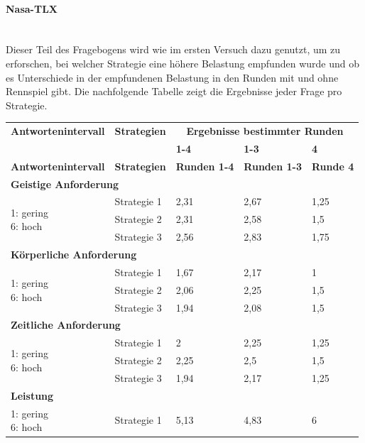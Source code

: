 \documentclass[12pt,a4paper]{scrartcl}
\begin{document}
\paragraph{Nasa-TLX}
~\\
Dieser Teil des Fragebogens wird wie im ersten Versuch dazu genutzt, um zu erforschen, bei welcher Strategie eine höhere Belastung empfunden wurde und ob es Unterschiede in der empfundenen Belastung in den Runden mit und ohne Rennspiel gibt. 
Die nachfolgende Tabelle zeigt die Ergebnisse jeder Frage pro Strategie.
\newpage
\begin{longtable}{|p{4cm}|p{2cm}|p{2cm}|p{2cm}|p{2cm}|}
	\hline
		\textbf{Antwortenintervall}&\textbf{Strategien}&\multicolumn{3}{c|}{\textbf{Ergebnisse bestimmter Runden}}\\
	&&\textbf{1-4}&\textbf{1-3} &\textbf{4}\\
	\hline
	\endfirsthead
	\hline
	\textbf{Antwortenintervall}&\textbf{Strategien}&\textbf{Runden 1-4}&\textbf{Runden 1-3} &\textbf{Runde 4}\\
	\hline
	\endhead
		\multicolumn{5}{l}{\textbf{Geistige Anforderung}}\\
		\hline
\multirow{3}{4cm}{1: gering \newline 6: hoch} & Strategie 1 &  2,31 & 2,67 & 1,25 \\
 & Strategie 2 & 2,31 & 2,58 & 1,5\\
 & Strategie 3 & 2,56 & 2,83 & 1,75 \\
\hline
		\multicolumn{5}{l}{\textbf{Körperliche Anforderung}}\\
		\hline
\multirow{3}{4cm}{1: gering \newline 6: hoch} & Strategie 1 & 1,67 & 2,17 & 1 \\
 & Strategie 2 & 2,06 & 2,25 & 1,5 \\
 & Strategie 3 & 1,94 & 2,08 & 1,5 \\
\hline
		\multicolumn{5}{l}{\textbf{Zeitliche Anforderung}}\\
		\hline
\multirow{3}{4cm}{1: gering \newline 6: hoch} & Strategie 1 & 2 & 2,25 & 1,25 \\
 & Strategie 2 & 2,25 & 2,5 & 1,5 \\
 & Strategie 3 & 1,94 & 2,17 & 1,25 \\
\hline
		\multicolumn{5}{l}{\textbf{Leistung}}\\
		\hline
\multirow{3}{4cm}{1: gering \newline 6: hoch} & Strategie 1 & 5,13 & 4,83 & 6 \\

\end{longtable}
\end{document}
